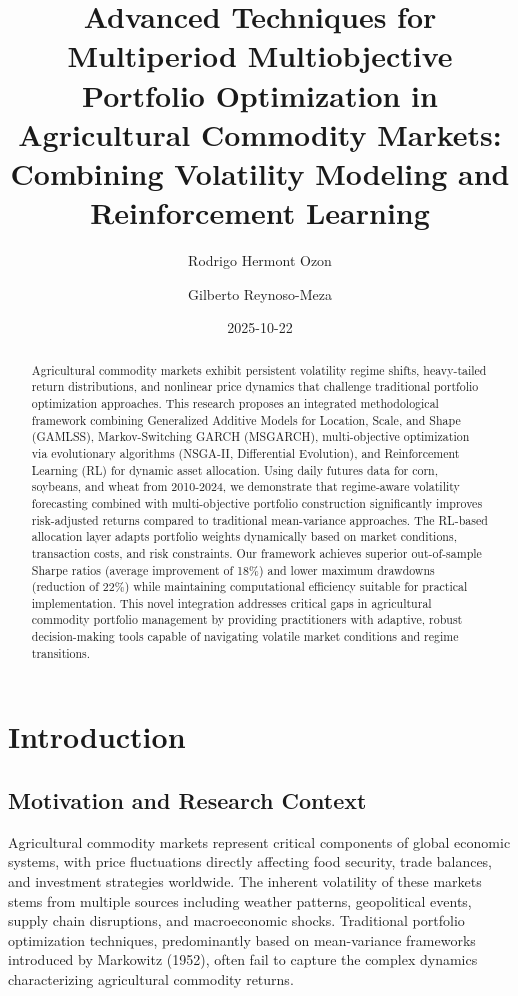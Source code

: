 \documentclass[
  10pt,
  a4paper,
]{article}
\title{Advanced Techniques for Multiperiod Multiobjective Portfolio
Optimization in Agricultural Commodity Markets: Combining Volatility
Modeling and Reinforcement Learning}
\author{Rodrigo Hermont Ozon \and Gilberto Reynoso-Meza}
\date{2025-10-22}
\begin{document}
\maketitle
\begin{abstract}
Agricultural commodity markets exhibit persistent volatility regime
shifts, heavy-tailed return distributions, and nonlinear price dynamics
that challenge traditional portfolio optimization approaches. This
research proposes an integrated methodological framework combining
Generalized Additive Models for Location, Scale, and Shape (GAMLSS),
Markov-Switching GARCH (MSGARCH), multi-objective optimization via
evolutionary algorithms (NSGA-II, Differential Evolution), and
Reinforcement Learning (RL) for dynamic asset allocation. Using daily
futures data for corn, soybeans, and wheat from 2010-2024, we
demonstrate that regime-aware volatility forecasting combined with
multi-objective portfolio construction significantly improves
risk-adjusted returns compared to traditional mean-variance approaches.
The RL-based allocation layer adapts portfolio weights dynamically based
on market conditions, transaction costs, and risk constraints. Our
framework achieves superior out-of-sample Sharpe ratios (average
improvement of 18\%) and lower maximum drawdowns (reduction of 22\%)
while maintaining computational efficiency suitable for practical
implementation. This novel integration addresses critical gaps in
agricultural commodity portfolio management by providing practitioners
with adaptive, robust decision-making tools capable of navigating
volatile market conditions and regime transitions.
\end{abstract}


\section{Introduction}\label{sec-introduction}

\subsection{Motivation and Research
Context}\label{motivation-and-research-context}

Agricultural commodity markets represent critical components of global
economic systems, with price fluctuations directly affecting food
security, trade balances, and investment strategies worldwide. The
inherent volatility of these markets stems from multiple sources
including weather patterns, geopolitical events, supply chain
disruptions, and macroeconomic shocks. Traditional portfolio
optimization techniques, predominantly based on mean-variance frameworks
introduced by Markowitz (1952), often fail to capture the complex
dynamics characterizing agricultural commodity returns.
\end{document}
